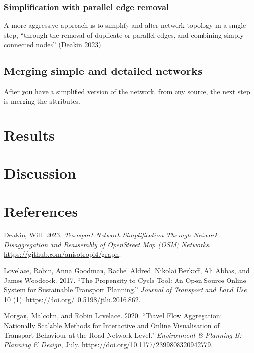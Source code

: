 \documentclass[
  letterpaper,
  DIV=11,
  numbers=noendperiod]{scrartcl}
\newlength{\cslhangindent}
\newlength{\cslentryspacingunit} %
\newenvironment{CSLReferences}[2] %
 {%
  \setlength{\parindent}{0pt}
  \ifodd #1
  \let\oldpar\par
  \def\par{\hangindent=\cslhangindent\oldpar}
  \fi
  \setlength{\parskip}{#2\cslentryspacingunit}
 }%
 {}
\begin{document}
\hypertarget{simplification-with-parallel-edge-removal}{%
\subsubsection{Simplification with parallel edge
removal}\label{simplification-with-parallel-edge-removal}}

A more aggressive approach is to simplify and alter network topology in
a single step, ``through the removal of duplicate or parallel edges, and
combining simply-connected nodes'' (Deakin 2023).

\hypertarget{merging-simple-and-detailed-networks}{%
\subsection{Merging simple and detailed
networks}\label{merging-simple-and-detailed-networks}}

After you have a simplified version of the network, from any source, the
next step is merging the attributes.

\hypertarget{sec-results}{%
\section{Results}\label{sec-results}}

\hypertarget{sec-discussion}{%
\section{Discussion}\label{sec-discussion}}

\hypertarget{references}{%
\section{References}\label{references}}

\hypertarget{refs}{}
\begin{CSLReferences}{1}{0}
\leavevmode{}%
Deakin, Will. 2023. \emph{Transport Network Simplification Through
Network Disaggregation and Reassembly of OpenStreet Map (OSM) Networks}.
\url{https://github.com/anisotropi4/graph}.

\leavevmode{}%
Lovelace, Robin, Anna Goodman, Rachel Aldred, Nikolai Berkoff, Ali
Abbas, and James Woodcock. 2017. {``The Propensity to Cycle Tool: An
Open Source Online System for Sustainable Transport Planning.''}
\emph{Journal of Transport and Land Use} 10 (1).
\url{https://doi.org/10.5198/jtlu.2016.862}.

\leavevmode{}%
Morgan, Malcolm, and Robin Lovelace. 2020. {``Travel Flow Aggregation:
Nationally Scalable Methods for Interactive and Online Visualisation of
Transport Behaviour at the Road Network Level.''} \emph{Environment \&
Planning B: Planning \& Design}, July.
\url{https://doi.org/10.1177/2399808320942779}.

\end{CSLReferences}
\end{document}
